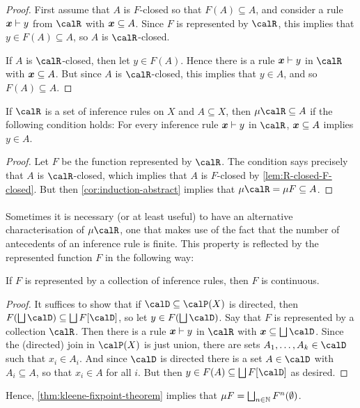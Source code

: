 \documentclass[a4paper, 11pt, article, danish, oneside]{memoir}
\newcommand{\naturals}{\mathbb{N}}
\DeclarePairedDelimiter{\auxdelimparen}{(}{)}
\DeclarePairedDelimiter{\auxdelimbracket}{[}{]}
\newcommand{\powerset}[2][]{\calP\auxdelimparen[#1]{#2}}
\DeclareMathOperator*{\smallbigsqcup}{\textstyle\bigsqcup}
\DeclareMathOperator*{\bigdjoin}{\mathchoice
    {\smallbigsqcup}%
    {\bigsqcup}%
    {\bigsqcup}%
    {\bigsqcup}%
}
\newcommand{\image}[2][]{\auxdelimbracket[#1]{#2}}
\newcommand{\newpar}{\paragraph{}}
\begin{document}
\begin{proof}
    First assume that $A$ is $F$-closed so that $F(A) \subseteq A$, and consider a rule $\myinfrule{}{\seq{x}}{y}$ from $\calR$ with $\bm{x} \subseteq A$. Since $F$ is represented by $\calR$, this implies that $y \in F(A) \subseteq A$, so $A$ is $\calR$-closed.

    If $A$ is $\calR$-closed, then let $y \in F(A)$. Hence there is a rule $\myinfrule{}{\seq{x}}{y}$ in $\calR$ with $\bm{x} \subseteq A$. But since $A$ is $\calR$-closed, this implies that $y \in A$, and so $F(A) \subseteq A$.
\end{proof}


\begin{theorem}
    \label{thm:rule-induction}
    If $\calR$ is a set of inference rules on $X$ and $A \subseteq X$, then $\mu \calR \subseteq A$ if the following condition holds: For every inference rule $\myinfrule{}{\seq{x}}{y}$ in $\calR$, $\bm{x} \subseteq A$ implies $y \in A$.
\end{theorem}

\begin{proof}
    Let $F$ be the function represented by $\calR$. The condition says precisely that $A$ is $\calR$-closed, which implies that $A$ is $F$-closed by \cref{lem:R-closed-F-closed}. But then \cref{cor:induction-abstract} implies that $\mu \calR = \mu F \subseteq A$.
\end{proof}


\newpar

\newcommand{\assum}[1]{\operatorname{asm}#1}
\newcommand{\concl}[1]{\operatorname{con}#1}
\newcommand{\derlen}[1]{l(#1)}


Sometimes it is necessary (or at least useful) to have an alternative characterisation of $\mu \calR$, one that makes use of the fact that the number of antecedents of an inference rule is finite. This property is reflected by the represented function $F$ in the following way:

\begin{lemma}
    \label{lem:inference-rules-continuous}
    If $F$ is represented by a collection of inference rules, then $F$ is continuous.
\end{lemma}

\begin{proof}
    It suffices to show that if $\calD \subseteq \powerset{X}$ is directed, then $F(\bigdjoin \calD) \subseteq \bigdjoin F\image{\calD}$, so let $y \in F(\bigdjoin \calD)$. Say that $F$ is represented by a collection $\calR$. Then there is a rule $\myinfrule{}{\seq{x}}{y}$ in $\calR$ with $\seq{x} \subseteq \bigdjoin \calD$. Since the (directed) join in $\powerset{X}$ is just union, there are sets $A_1, \ldots, A_k \in \calD$ such that $x_i \in A_i$. And since $\calD$ is directed there is a set $A \in \calD$ with $A_i \subseteq A$, so that $x_i \in A$ for all $i$. But then $y \in F(A) \subseteq \bigdjoin F\image{\calD}$ as desired.
\end{proof}
%
Hence, \cref{thm:kleene-fixpoint-theorem} implies that $\mu F = \bigdjoin_{n \in \naturals} F^n(\emptyset)$.
\end{document}
